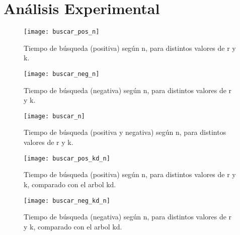 \section{Análisis Experimental}

\begin{figure}
  \begin{center}
  \texttt{[image: buscar\_pos\_n]}
  \caption{Tiempo de búsqueda (positiva)
    según n, para distintos valores de r y k.}
  \label{fig:buscar-pos}
  \end{center}
\end{figure}


\begin{figure}
  \begin{center}
  \texttt{[image: buscar\_neg\_n]}
  \caption{Tiempo de búsqueda (negativa)
    según n, para distintos valores de r y k.}
  \label{fig:buscar-neg}
  \end{center}
\end{figure}

\begin{figure}
  \begin{center}
  \texttt{[image: buscar\_n]}
  \caption{Tiempo de búsqueda (positiva y negativa)
    según n, para distintos valores de r y k.}
  \label{fig:buscar-neg}
  \end{center}
\end{figure}


\begin{figure}
  \begin{center}
  \texttt{[image: buscar\_pos\_kd\_n]}
  \caption{Tiempo de búsqueda (positiva)
    según n, para distintos valores de r y k, comparado con el arbol kd.}
  \label{fig:pos-vs-kd}
  \end{center}
\end{figure}


\begin{figure}
  \begin{center}
  \texttt{[image: buscar\_neg\_kd\_n]}
  \caption{Tiempo de búsqueda (negativa)
    según n, para distintos valores de r y k, comparado con el arbol kd.}
  \label{fig:pos-vs-kd}
  \end{center}
\end{figure}